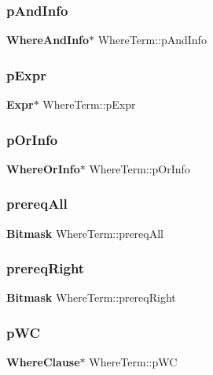 \mbox{\label{struct_where_term_a1c2e013c4628164636e36db73f429dea}} 
\subsubsection{pAndInfo}
{\footnotesize\ttfamily \textbf{ Where\+And\+Info}$\ast$ Where\+Term\+::p\+And\+Info}

\mbox{\label{struct_where_term_af5ec32fe3a2e4623c900cb91aa86bc9d}} 
\subsubsection{pExpr}
{\footnotesize\ttfamily \textbf{ Expr}$\ast$ Where\+Term\+::p\+Expr}

\mbox{\label{struct_where_term_a5f26d197224ff20bc8db4350e6e30c3f}} 
\subsubsection{pOrInfo}
{\footnotesize\ttfamily \textbf{ Where\+Or\+Info}$\ast$ Where\+Term\+::p\+Or\+Info}

\mbox{\label{struct_where_term_a49b700336b005067352366cfc40de07f}} 
\subsubsection{prereqAll}
{\footnotesize\ttfamily \textbf{ Bitmask} Where\+Term\+::prereq\+All}

\mbox{\label{struct_where_term_a1274011fa1ef0639284b7944f4570e67}} 
\subsubsection{prereqRight}
{\footnotesize\ttfamily \textbf{ Bitmask} Where\+Term\+::prereq\+Right}

\mbox{\label{struct_where_term_a1fb0a9ede5a12d6d2f7886431b348fb3}} 
\subsubsection{pWC}
{\footnotesize\ttfamily \textbf{ Where\+Clause}$\ast$ Where\+Term\+::p\+WC}

